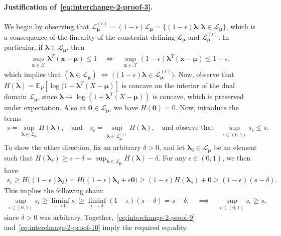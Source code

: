 \documentclass{article}
\theoremstyle{plain}
\theoremstyle{definition}
\newcommand{\calX}{\mathcal X}
\newcommand{\calL}{\mathcal L}
\newcommand{\xvec}{\mathbf{x}}
\newcommand{\qtext}[1]{\quad \text{#1} \quad}
\newcommand{\boldlambda}{\boldsymbol{\lambda}}
\newcommand{\boldmu}{\boldsymbol{\mu}}
\newcommand{\dualdomain}{\calL_{\boldmu}}
\newcommand{\epsdualdomain}{\calL_{\boldmu}^{(\epsilon)}}
\begin{document}
\paragraph{Justification of~\eqref{eq:interchange-2-proof-3}.} We begin by observing that $\epsdualdomain = (1-\epsilon)\dualdomain = \{(1-\epsilon) \boldlambda: \boldlambda \in \dualdomain\}$, which is  a consequence of the linearity of the constraint defining $\dualdomain$ and $\epsdualdomain$.  In particular, if $\boldlambda \in \dualdomain$, then 
\begin{align}
    \sup_{\xvec \in \calX} \boldlambda^T(\xvec - \boldmu) \leq 1 \quad \iff \quad 
    \sup_{\xvec \in \calX} (1-\epsilon)\boldlambda^T(\xvec - \boldmu) \leq 1-\epsilon, 
\end{align}
which implies that $(\boldlambda \in \dualdomain) \; \iff \; \big( (1-\epsilon)\boldlambda \in \epsdualdomain\big)$. 
Now, observe that $H(\boldlambda) = \mathbb{E}_P[\log(1 - \boldlambda^T(X-\boldmu)]$ is concave on the interior of the dual domain $\dualdomain$, since $\boldlambda \mapsto \log(1 + \boldlambda^T(X-\boldmu))$ is concave, which is preserved under expectation. Also  at $\boldsymbol{0} \in \dualdomain$, we have $H(\boldsymbol{0}) = 0$. Now, introduce the terms 
\begin{align}
    s = \sup_{\boldlambda \in \dualdomain} H(\boldlambda), \qtext{and} s_\epsilon = \sup_{\boldlambda \in \epsdualdomain} H(\boldlambda), \qtext{and observe that}  \sup_{\epsilon \in (0,1)} s_\epsilon \leq s.  \label{eq:interchange-2-proof-9}
\end{align}
To show the other direction, fix an arbitrary $\delta >0$, and let $\boldlambda_\delta \in \dualdomain$ be an element such that $H(\boldlambda_\delta) \geq s - \delta = \sup_{\boldlambda \in \dualdomain} H(\boldlambda) - \delta$. For any $\epsilon \in (0, 1)$, we then have 
\begin{align}
    s_\epsilon \geq H\big( (1-\epsilon) \boldlambda_\delta \big) = H\big( (1-\epsilon) \boldlambda_\delta + \epsilon \boldsymbol{0}\big) \geq (1-\epsilon) H(\boldlambda_\delta) + 0 \geq (1-\epsilon) (s - \delta). 
\end{align}
This implies the following chain: 
\begin{align}
    \sup_{\epsilon \in (0,1)} s_\epsilon \geq \liminf_{ \epsilon \to 0} s_\epsilon  \geq \liminf_{\epsilon \to 0} (1-\epsilon) (s-\delta) = s-\delta, \quad \implies \quad 
    \sup_{\epsilon \in (0,1)} s_\epsilon \geq s, \label{eq:interchange-2-proof-10}
\end{align}
since $\delta>0$ was arbitrary. 
Together,~\eqref{eq:interchange-2-proof-9} and~\eqref{eq:interchange-2-proof-10} imply the required equality.  \hfill \qedsymbol
\end{document}
